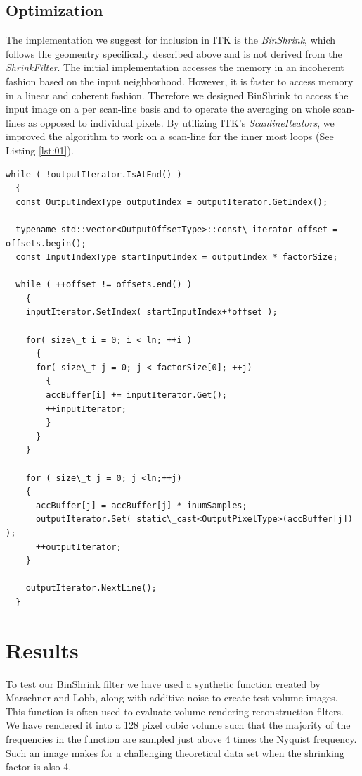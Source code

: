 \documentclass{InsightArticle}
\begin{document}
\subsection{Optimization}

The implementation we suggest for inclusion in ITK is the
\textit{BinShrink}, which follows the geomentry specifically described
above and is not derived from the \textit{ShrinkFilter}. The initial
implementation accesses the memory in an incoherent fashion based on
the input neighborhood. However, it is faster to access memory in a
linear and coherent fashion. Therefore we designed BinShrink 
to access the input image on a per scan-line basis and to operate the
averaging on whole scan-lines as opposed to individual pixels. By utilizing ITK's
\textit{ScanlineIteators}, we improved the algorithm to work on a
scan-line for the inner most loops (See Listing \ref{lst:01}).

\begin{lstlisting}[label=lst:02, caption={A selection of code from the
  \textit{BinShrink} filter demonstrating scan-line averaging.}]
while ( !outputIterator.IsAtEnd() )
  {
  const OutputIndexType outputIndex = outputIterator.GetIndex();

  typename std::vector<OutputOffsetType>::const\_iterator offset = offsets.begin();
  const InputIndexType startInputIndex = outputIndex * factorSize;

  while ( ++offset != offsets.end() )
    {
    inputIterator.SetIndex( startInputIndex+*offset );

    for( size\_t i = 0; i < ln; ++i )
      {
      for( size\_t j = 0; j < factorSize[0]; ++j)
        {
        accBuffer[i] += inputIterator.Get();
        ++inputIterator;
        }
      }
    }

    for ( size\_t j = 0; j <ln;++j)
    {
      accBuffer[j] = accBuffer[j] * inumSamples;
      outputIterator.Set( static\_cast<OutputPixelType>(accBuffer[j]) );
      ++outputIterator;
    }

    outputIterator.NextLine();
  }
\end{lstlisting}

\section{Results}

To test our BinShrink filter we have used a synthetic function
created by Marschner and Lobb\cite{MarschnerL94}, along with additive
noise to create test volume images. This function is often used to
evaluate volume rendering reconstruction filters. We have rendered it
into a 128 pixel cubic volume such that the majority of the frequencies in
the function are sampled just above 4 times the Nyquist frequency. Such an image
makes for a challenging theoretical data set when the shrinking factor is also
4.
\end{document}
